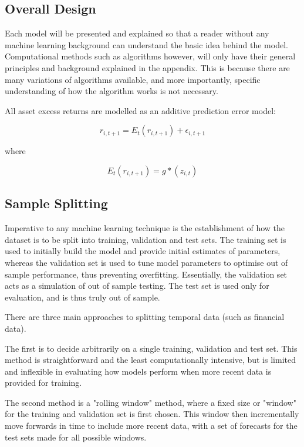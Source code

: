 \documentclass[man, a4paper, biblatex]{apa6}
\begin{document}
\subsection{Overall Design}

Each model will be presented and explained so that a reader without any machine learning background can understand the basic idea behind the model. Computational methods such as algorithms however, will only have their general principles and background explained in the appendix. This is because there are many variations of algorithms available, and more importantly, specific understanding of how the algorithm works is not necessary. 

All asset excess returns are modelled as an additive prediction error model:

\begin{equation}
	r_{i, t+1} = E_t(r_{i, t+1}) + \epsilon_{i, t+1}
\end{equation}

where 

\begin{equation}
	E_t(r_{i, t+1}) = g*(z_{i,t})
\end{equation}

\subsection{Sample Splitting}

Imperative to any machine learning technique is the establishment of how the dataset is to be split into training, validation and test sets. The training set is used to initially build the model and provide initial estimates of parameters, whereas the validation set is used to tune model parameters to optimise out of sample performance, thus preventing overfitting. Essentially, the validation set acts as a simulation of out of sample testing. The test set is used only for evaluation, and is thus truly out of sample.

There are three main approaches to splitting temporal data (such as financial data). 

The first is to decide arbitrarily on a single training, validation and test set. This method is straightforward and the least computationally intensive, but is limited and inflexible in evaluating how models perform when more recent data is provided for training. 

The second method is a "rolling window" method, where a fixed size or "window" for the training and validation set is first chosen. This window then incrementally move forwards in time to include more recent data, with a set of forecasts for the test sets made for all possible windows.
\end{document}
